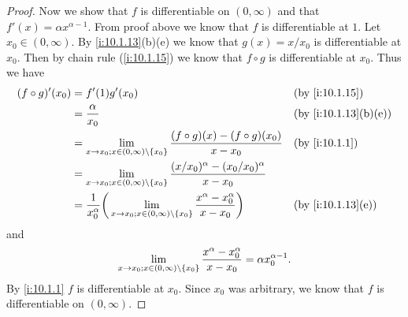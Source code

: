 \begin{proof}
  Now we show that \(f\) is differentiable on \((0, \infty)\) and that \(f'(x) = \alpha x^{\alpha - 1}\).
  From proof above we know that \(f\) is differentiable at \(1\).
  Let \(x_0 \in (0, \infty)\).
  By \cref{i:10.1.13}(b)(e) we know that \(g(x) = x / x_0\) is differentiable at \(x_0\).
  Then by chain rule (\cref{i:10.1.15}) we know that \(f \circ g\) is differentiable at \(x_0\).
  Thus we have
  \begin{align*}
    (f \circ g)'(x_0) & = f'(1) g'(x_0)                                                                                                                           &  & \by{i:10.1.15}      \\
                      & = \dfrac{\alpha}{x_0}                                                                                                                     &  & \by{i:10.1.13}[b,e] \\
                      & = \lim_{x \to x_0 ; x \in (0, \infty) \setminus \set{x_0}} \dfrac{(f \circ g)(x) - (f \circ g)(x_0)}{x - x_0}                             &  & \by{i:10.1.1}       \\
                      & = \lim_{x \to x_0 ; x \in (0, \infty) \setminus \set{x_0}} \dfrac{(x / x_0)^{\alpha} - (x_0 / x_0)^{\alpha}}{x - x_0}                                              \\
                      & = \dfrac{1}{x_0^{\alpha}} \bigg(\lim_{x \to x_0 ; x \in (0, \infty) \setminus \set{x_0}} \dfrac{x^{\alpha} - x_0^{\alpha}}{x - x_0}\bigg) &  & \by{i:10.1.13}[e]
  \end{align*}
  and
  \[
    \lim_{x \to x_0 ; x \in (0, \infty) \setminus \left\lbrace x_0\right\rbrace} \dfrac{x^{\alpha} - x_0^{\alpha}}{x - x_0} = \alpha x_0^{\alpha - 1}.
  \]
  By \cref{i:10.1.1} \(f\) is differentiable at \(x_0\).
  Since \(x_0\) was arbitrary, we know that \(f\) is differentiable on \((0, \infty)\).
\end{proof}
